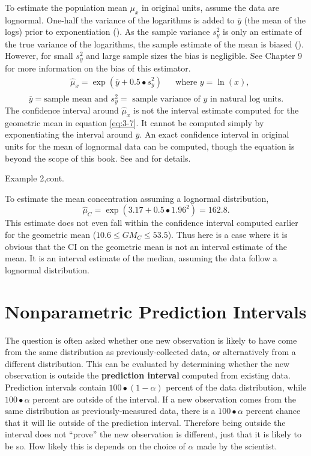\documentclass[]{book}
\begin{document}
To estimate the population mean \(\mu_{x}\) in original units, assume the data are lognormal. One-half the variance of the logarithms is added to \(\overline{y}\) (the mean of the logs) prior to exponentiation (\citet{aitchison_lognormal_1981}). As the sample variance \(s^{2}_{y}\) is only an estimate of the true variance of the logarithms, the sample estimate of the mean is biased (\citet{bradu_estimation_1970}). However, for small \(s^{2}_{y}\) and large sample sizes the bias is negligible. See Chapter 9 for more information on the bias of this estimator.
\begin{equation}
\begin{aligned}
& \hat{\mu}_{x} = \exp{\left( \overline{y} + 0.5 \bullet s^{2}_{y} \right)} &&\text{where $y = \ln{(x)}$,} \\
\end{aligned}
\label{eq:3-9}
\end{equation}
\[\overline{y} = \text{sample mean and $s^{2}_{y} =$ sample variance of $y$ in natural log units.}\]
The confidence interval around \(\hat{\mu}_{x}\) is not the interval estimate computed for the geometric mean in equation \eqref{eq:3-7}. It cannot be computed simply by exponentiating the interval around \(\overline{y}\). An exact confidence interval in original units for the mean of lognormal data can be computed, though the equation is beyond the scope of this book. See \citet{land_confidence_1971} and \citet{land_evaluation_1972} for details.

Example 2,cont.

To estimate the mean concentration assuming a lognormal distribution, \[\hat{\mu}_{C} = \exp{\left( 3.17 + 0.5 \bullet 1.96^{2} \right)} = 162.8 .\] This estimate does not even fall within the confidence interval computed earlier for the geometric mean (\(10.6 \leq GM_{C} \leq 53.5\)). Thus here is a case where it is obvious that the CI on the geometric mean is not an interval estimate of the mean. It is an interval estimate of the median, assuming the data follow a lognormal distribution.

\hypertarget{ch3-5}{%
\section{Nonparametric Prediction Intervals}\label{ch3-5}}

The question is often asked whether one new observation is likely to have come from the same distribution as previously-collected data, or alternatively from a different distribution. This can be evaluated by determining whether the new observation is outside the \textbf{prediction interval} computed from existing data. Prediction intervals contain \(100 \bullet (1 − \alpha)\) percent of the data distribution, while \(100 \bullet \alpha\) percent are outside of the interval. If a new observation comes from the same distribution as previously-measured data, there is a \(100 \bullet \alpha\) percent chance that it will lie outside of the prediction interval. Therefore being outside the interval does not ``prove'' the new observation is different, just that it is likely to be so. How likely this is depends on the choice of \(\alpha\) made by the scientist.
\end{document}
